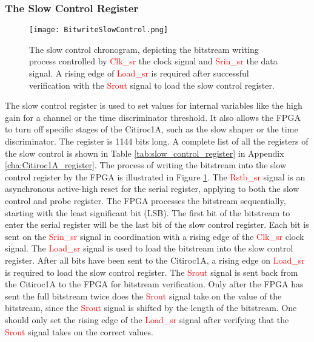 \subsubsection{The Slow Control Register}

\begin{figure}
    \centering
    \texttt{[image: BitwriteSlowControl.png]}
    \caption{The slow control chronogram, depicting the bitstream writing process controlled by  \textcolor{red}{Clk\_sr} the clock signal and  \textcolor{red}{Srin\_sr} the data signal. A rising edge of \textcolor{red}{Load\_sr} is required
     after successful verification with the \textcolor{red}{Srout} signal to load the slow control register.\autocite{datasheetCITIROC}}
    \label{fig:CITIROC1A_writing_bitstream}
\end{figure}
The slow control register is used to set values for internal variables like the high gain for a channel or the time discriminator threshold.
It also allows the FPGA to turn off specific stages of the Citiroc1A, such as the slow shaper or the time discriminator.
The register is 1144 bits long. A complete list of all the registers of the slow control is shown in Table \ref{tab:slow_control_register} in Appendix \ref{cha:Citiroc1A_register}.
\newline
The process of writing the bitstream into the slow control register by the FPGA is illustrated in Figure \ref{fig:CITIROC1A_writing_bitstream}.
\newline
The \textcolor{red}{Rstb\_sr} signal is an asynchronous active-high reset for the serial register, applying to both the slow control and probe register. 
\newline
The FPGA processes the bitstream sequentially, starting with the least significant bit (LSB).
The first bit of the bitstream to enter the serial register will be the last bit of the slow control register.
Each bit is sent on the \textcolor{red}{Srin\_sr} signal in coordination with a rising edge of the \textcolor{red}{Clk\_sr} clock signal.
\newline
The \textcolor{red}{Load\_sr} signal is used to load the bitstream into the slow control register. After all bits have been sent to the Citiroc1A,
a rising edge on \textcolor{red}{Load\_sr} is required to load the slow control register.
\newline
The \textcolor{red}{Srout} signal is sent back from the Citiroc1A to the FPGA for bitstream verification.
Only after the FPGA has sent the full bitstream twice does the \textcolor{red}{Srout} signal take on the value of the bitstream, since the \textcolor{red}{Srout} signal is shifted by the length of the bitstream.\autocite{datasheetCITIROC}
One should only set the rising edge of the \textcolor{red}{Load\_sr} signal after verifying that the \textcolor{red}{Srout} signal takes on the correct values.


